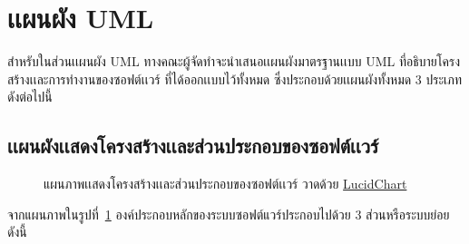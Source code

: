 \documentclass[12pt,oneside,openright,a4paper]{cpe-thai-project}
\begin{document}
\section{เเผนผัง UML}
สำหรับในส่วนเเผนผัง UML ทางคณะผู้จัดทำจะนำเสนอเเผนผังมาตรฐานเเบบ UML ที่อธิบายโครงสร้างเเละการทำงานของซอฟต์เเวร์ ที่ได้ออกเเบบไว้ทั้งหมด ซึ่งประกอบด้วยเเผนผังทั้งหมด 3 ประเภทดังต่อไปนี้
    \subsection{เเผนผังเเสดงโครงสร้างเเละส่วนประกอบของซอฟต์เเวร์}
        \hypertarget{comp-diagram}{
            \begin{figure}[!h]
            \centering
                \caption[ภาพแผนผังเเสดงโครงสร้างเเละส่วนประกอบของซอฟต์เเวร์]{แผนภาพเเสดงโครงสร้างเเละส่วนประกอบของซอฟต์เเวร์ วาดด้วย \href{https://lucid.app/}{LucidChart}}
                \label{fig:comp-diagram}
            \end{figure}
        }
        จากแผนภาพในรูปที่~\ref{fig:comp-diagram} องค์ประกอบหลักของระบบซอฟต์แวร์ประกอบไปด้วย 3 ส่วนหรือระบบย่อยดังนี้
\end{document}
